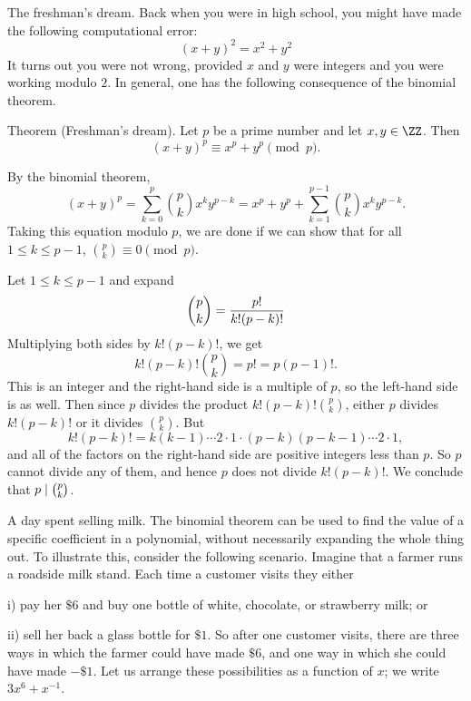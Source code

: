 \medskip\boldlabel The freshman's dream. Back when you were in high school, you might
have made the following computational error:
$$(x+y)^2 = x^2 + y^2$$
It turns out you were not wrong, provided $x$ and $y$ were integers
and you were working modulo $2$. In general, one has the following consequence of the binomial theorem.

\parenproclaim Theorem {\advthm} (Freshman's dream). Let $p$ be a prime number
and let $x,y\in \ZZ$. Then
$$(x+y)^p \equiv x^p + y^p \pmod p.$$

\proof By the binomial theorem,
$$(x+y)^p = \sum_{k=0}^p {p\choose k} x^k y^{p-k}
= x^p + y^p + \sum_{k=1}^{p-1} {p\choose k}x^k y^{p-k}.$$
Taking this equation modulo $p$,
we are done if we can show that for all $1\le k\le p-1$, ${p\choose k} \equiv 0\pmod p$.

Let $1\le k\le p-1$ and expand
$${p\choose k} = {p!\over k!(p-k)!}$$
Multiplying both sides by $k!(p-k)!$, we get
$$k!(p-k)!{p\choose k} = p! = p(p-1)!.$$
This is an integer and the
right-hand side is a multiple of $p$, so the left-hand side is as well. Then since $p$ divides
the product $k!(p-k)!{p\choose k}$, either $p$ divides $k!(p-k)!$ or it divides $p\choose k$.
But
$$k!(p-k)! = k(k-1)\cdots 2\cdot 1\cdot (p-k)(p-k-1)\cdots 2\cdot 1,$$
and all of the factors on the right-hand side are positive integers less than $p$. So $p$ cannot divide
any of them, and hence $p$ does not divide $k!(p-k)!$. We conclude that $p\mid {p\choose k}$.\slug

\medskip\boldlabel{} A day spent selling milk.
The binomial theorem can be used to find the value of a specific coefficient in a polynomial,
without necessarily expanding the whole thing out. To illustrate this, consider the following
scenario. Imagine that a farmer runs a roadside
milk stand. Each time a customer visits they either
\medskip
\item{i)} pay her $\$6$ and buy one bottle of white, chocolate, or strawberry milk; or
\smallskip
\item{ii)} sell her back a glass bottle for $\$1$.
\medskip
So after one customer visits, there are three ways in which the farmer could have
made $\$6$, and one way in which she could have made $-\$1$. Let us arrange these
possibilities as a function of $x$; we write $3x^6 + x^{-1}$.

